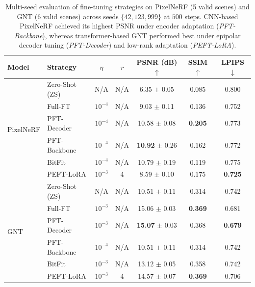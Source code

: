 \begin{table}[!t]
\centering
\caption{Multi-seed evaluation of fine-tuning strategies on PixelNeRF (5 valid scenes) and GNT (6 valid scenes) across seeds $\{42, 123, 999\}$ at $500$ steps. CNN-based PixelNeRF achieved its highest PSNR under encoder adaptation (\textit{PFT-Backbone}), whereas transformer-based GNT performed best under epipolar decoder tuning (\textit{PFT-Decoder}) and low-rank adaptation (\textit{PEFT-LoRA}).}
\label{tab:mixed_model_comparison}
\scriptsize
\setlength{\tabcolsep}{2.5pt}
\begin{tabular*}{\linewidth}{@{\extracolsep{\fill}}llccccc@{\extracolsep{0pt}}}
\toprule
Model & Strategy & $\eta$ & $r$ & PSNR (dB) $\uparrow$ & SSIM $\uparrow$ & LPIPS $\downarrow$ \\
\midrule
\multirow{6}{*}{PixelNeRF}
 & Zero-Shot (ZS)   & N/A        & N/A    & 6.35 $\pm$ 0.05            & 0.085    & 0.800    \\
 & Full-FT          & $10^{-4}$  & N/A    & 9.03 $\pm$ 0.11            & 0.136    & 0.752    \\
 & PFT-Decoder      & $10^{-4}$  & N/A    & 10.58 $\pm$ 0.08           & \textbf{0.205} & 0.773    \\
 & PFT-Backbone     & $10^{-4}$  & N/A    & \textbf{10.92} $\pm$ 0.26  & 0.162    & 0.772    \\
 & BitFit           & $10^{-4}$  & N/A    & 10.79 $\pm$ 0.19           & 0.119    & 0.775    \\
 & PEFT-LoRA        & $10^{-3}$  & 4      & 8.59 $\pm$ 0.10            & 0.175    & \textbf{0.725} \\
\midrule
\multirow{6}{*}{GNT}
 & Zero-Shot (ZS)   & N/A        & N/A    & 10.51 $\pm$ 0.11           & 0.314    & 0.742    \\
 & Full-FT          & $10^{-3}$  & N/A    & 15.06 $\pm$ 0.03           & \textbf{0.369} & 0.681    \\
 & PFT-Decoder      & $10^{-3}$  & N/A    & \textbf{15.07} $\pm$ 0.03  & 0.368    & \textbf{0.679} \\
 & PFT-Backbone     & $10^{-4}$  & N/A    & 10.51 $\pm$ 0.11           & 0.314    & 0.742    \\
 & BitFit           & $10^{-3}$  & N/A    & 13.12 $\pm$ 0.05            & 0.358    & 0.742    \\
 & PEFT-LoRA        & $10^{-3}$  & 4      & 14.57 $\pm$ 0.07           & \textbf{0.369} & 0.706    \\
\bottomrule
\end{tabular*}
\end{table}

